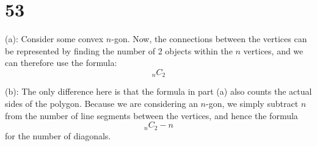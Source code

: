 \documentclass{article}
\theoremstyle{definition}
\newcommand{\?}{\stackrel{?}{=}}
\begin{document}
\section*{53}
(a): Consider some convex $n$-gon. Now, the connections between the vertices can be represented by finding the number of 2 objects within the $n$ 
vertices, and we can therefore use the formula:
\[ _nC_2 \]


(b): The only difference here is that the formula in part (a) also counts the actual sides of the polygon. Because we are considering an $n$-gon, we simply 
subtract $n$ from the number of line segments between the vertices, and hence the formula
\[ _nC_2-n \] for the number of diagonals.
\end{document}
